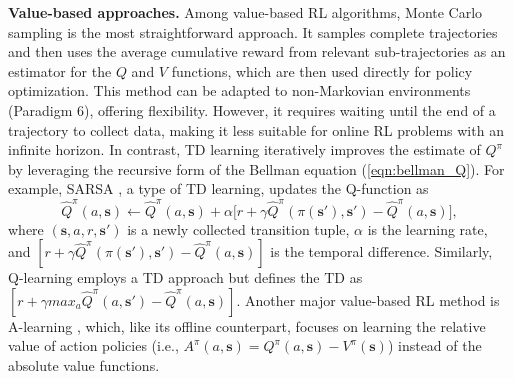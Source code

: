 \textbf{Value-based approaches. }
Among value-based \acrshort{RL} algorithms, Monte Carlo sampling  \citep{singh1996reinforcement} is the most straightforward approach. It samples complete trajectories and then uses the average cumulative reward from relevant sub-trajectories as an estimator for the $Q$ and $V$ functions, which are then used directly for policy optimization. This method can be adapted to non-Markovian environments (Paradigm 6), offering flexibility. However, it requires waiting until the end of a trajectory to collect data, making it less suitable for online \acrshort{RL} problems with an infinite horizon. In contrast, \acrfull{TD}\citep{sutton1988learning} learning iteratively improves the estimate of $Q^{\pi}$ by leveraging the recursive form of the Bellman equation (\ref{eqn:bellman_Q}). For example, SARSA \citep{rummery1994line}, a type of \acrshort{TD} learning, updates the Q-function as
\begin{equation*}
    \hat{Q}^\pi(a, \boldsymbol{s}) \leftarrow \hat{Q}^\pi(a, \boldsymbol{s}) + \alpha \Big[r + \gamma \hat{Q}^\pi(\pi(\boldsymbol{s}'), \boldsymbol{s}')  - \hat{Q}^\pi(a, \boldsymbol{s}) \Big], 
\end{equation*} 
where $(\boldsymbol{s},a,r,\boldsymbol{s}')$ is a newly collected transition tuple, $\alpha$ is the learning rate, and $[r + \gamma \hat{Q}^\pi(\pi(\boldsymbol{s}'), \boldsymbol{s}')  - \hat{Q}^\pi(a, \boldsymbol{s})]$ is the temporal difference. Similarly, Q-learning  \citep{watkins1992q} employs a \acrshort{TD} approach but defines the \acrshort{TD} as $[r + \gamma max_a\hat{Q}^\pi(a, \boldsymbol{s}')  - \hat{Q}^\pi(a, \boldsymbol{s})]$. Another major value-based \acrshort{RL} method is A-learning \citep{baird1993advantage,gu2016continuous,schulman2015high,li2019hierarchical}, which, like its offline counterpart, focuses on learning the relative value of action policies (i.e., $A^{\pi}(a,\boldsymbol{s}) = Q^{\pi}(a,\boldsymbol{s}) - V^{\pi}(\boldsymbol{s})$) instead of the absolute value functions. 

